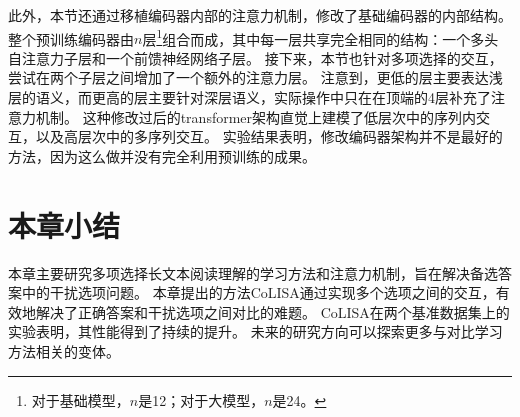 此外，本节还通过移植编码器内部的注意力机制，修改了基础编码器的内部结构。
整个预训练编码器由$n$层\footnote{对于基础模型，$n$是12；对于大模型，$n$是24。}组合而成，其中每一层共享完全相同的结构：一个多头自注意力子层和一个前馈神经网络子层。
接下来，本节也针对多项选择的交互，尝试在两个子层之间增加了一个额外的注意力层。
注意到，更低的层主要表达浅层的语义，而更高的层主要针对深层语义，实际操作中只在在顶端的4层补充了注意力机制。
这种修改过后的transformer架构直觉上建模了低层次中的序列内交互，以及高层次中的多序列交互。
实验结果表明，修改编码器架构并不是最好的方法，因为这么做并没有完全利用预训练的成果。


\section{本章小结}
本章主要研究多项选择长文本阅读理解的学习方法和注意力机制，旨在解决备选答案中的干扰选项问题。
本章提出的方法CoLISA通过实现多个选项之间的交互，有效地解决了正确答案和干扰选项之间对比的难题。
CoLISA在两个基准数据集上的实验表明，其性能得到了持续的提升。
未来的研究方向可以探索更多与对比学习方法相关的变体。


